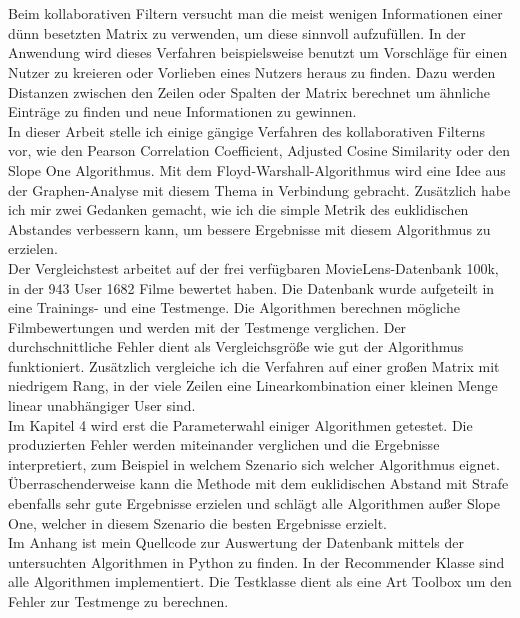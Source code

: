 \section*{}
Beim kollaborativen Filtern versucht man die meist wenigen Informationen einer dünn besetzten Matrix zu verwenden, um diese sinnvoll aufzufüllen. In der Anwendung wird dieses Verfahren beispielsweise benutzt um Vorschläge für einen Nutzer zu kreieren oder Vorlieben eines Nutzers heraus zu finden. Dazu werden Distanzen zwischen den Zeilen oder Spalten der Matrix berechnet um ähnliche Einträge zu finden und neue Informationen zu gewinnen.\\
In dieser Arbeit stelle ich einige gängige Verfahren des kollaborativen Filterns vor, wie den Pearson Correlation Coefficient, Adjusted Cosine Similarity oder den Slope One Algorithmus. Mit dem Floyd-Warshall-Algorithmus wird eine Idee aus der Graphen-Analyse mit diesem Thema in Verbindung gebracht. Zusätzlich habe ich mir zwei Gedanken gemacht, wie ich die simple Metrik des euklidischen Abstandes verbessern kann, um bessere Ergebnisse mit diesem Algorithmus zu erzielen.\\
Der Vergleichstest arbeitet auf der frei verfügbaren MovieLens-Datenbank 100k, in der 943 User 1682 Filme bewertet haben. Die Datenbank wurde aufgeteilt in eine Trainings- und eine Testmenge. Die Algorithmen berechnen mögliche Filmbewertungen und werden mit der Testmenge verglichen. Der durchschnittliche Fehler dient als Vergleichsgröße wie gut der Algorithmus funktioniert. Zusätzlich vergleiche ich die Verfahren auf einer großen Matrix mit niedrigem Rang, in der viele Zeilen eine Linearkombination einer kleinen Menge linear unabhängiger User sind.\\
Im Kapitel 4 wird erst die Parameterwahl einiger Algorithmen getestet. Die produzierten Fehler werden miteinander verglichen und die Ergebnisse interpretiert, zum Beispiel in welchem Szenario sich welcher Algorithmus eignet. Überraschenderweise kann die Methode mit dem euklidischen Abstand mit Strafe ebenfalls sehr gute Ergebnisse erzielen und schlägt alle Algorithmen außer Slope One, welcher in diesem Szenario die besten Ergebnisse erzielt.\\
Im Anhang ist mein Quellcode zur Auswertung der Datenbank mittels der untersuchten Algorithmen in Python zu finden. In der Recommender Klasse sind alle Algorithmen implementiert. Die Testklasse dient als eine Art Toolbox um den Fehler zur Testmenge zu berechnen.
